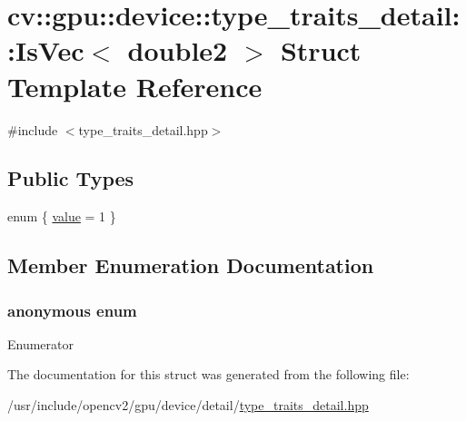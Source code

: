 \hypertarget{structcv_1_1gpu_1_1device_1_1type__traits__detail_1_1IsVec_3_01double2_01_4}{\section{cv\-:\-:gpu\-:\-:device\-:\-:type\-\_\-traits\-\_\-detail\-:\-:Is\-Vec$<$ double2 $>$ Struct Template Reference}
\label{structcv_1_1gpu_1_1device_1_1type__traits__detail_1_1IsVec_3_01double2_01_4}
}


{\ttfamily \#include $<$type\-\_\-traits\-\_\-detail.\-hpp$>$}

\subsection*{Public Types}
\begin{DoxyCompactItemize}
\item 
enum \{ \hyperlink{structcv_1_1gpu_1_1device_1_1type__traits__detail_1_1IsVec_3_01double2_01_4_a2e4ef307be7db530015f657cf5a779ffad1601a272f9367b3b0b4ce4640015ea2}{value} = 1
 \}
\end{DoxyCompactItemize}


\subsection{Member Enumeration Documentation}
\hypertarget{structcv_1_1gpu_1_1device_1_1type__traits__detail_1_1IsVec_3_01double2_01_4_a2e4ef307be7db530015f657cf5a779ff}{\subsubsection[{anonymous enum}]{\setlength{\rightskip}{0pt plus 5cm}anonymous enum}}\label{structcv_1_1gpu_1_1device_1_1type__traits__detail_1_1IsVec_3_01double2_01_4_a2e4ef307be7db530015f657cf5a779ff}
\begin{Desc}
\item[Enumerator]\par
\begin{description}
\item[{\em 
\hypertarget{structcv_1_1gpu_1_1device_1_1type__traits__detail_1_1IsVec_3_01double2_01_4_a2e4ef307be7db530015f657cf5a779ffad1601a272f9367b3b0b4ce4640015ea2}{value}\label{structcv_1_1gpu_1_1device_1_1type__traits__detail_1_1IsVec_3_01double2_01_4_a2e4ef307be7db530015f657cf5a779ffad1601a272f9367b3b0b4ce4640015ea2}
}]\end{description}
\end{Desc}


The documentation for this struct was generated from the following file\-:\begin{DoxyCompactItemize}
\item 
/usr/include/opencv2/gpu/device/detail/\hyperlink{type__traits__detail_8hpp}{type\-\_\-traits\-\_\-detail.\-hpp}\end{DoxyCompactItemize}
